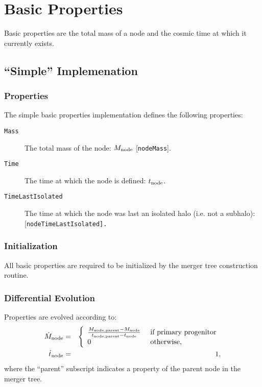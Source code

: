 \section{Basic Properties}\label{sec:ComponentBasicProperties}

Basic properties are the total mass of a \gls{node} and the cosmic time at which it currently exists.

\subsection{``Simple'' Implemenation}

\subsubsection{Properties}

The simple basic properties implementation defines the following properties:
\begin{description}
 \item [{\tt Mass}] The total mass of the node: $M_{\rm node}$ [{\tt nodeMass}].
 \item [{\tt Time}] The time at which the \gls{node} is defined: $t_{\rm node}$.
 \item [{\tt TimeLastIsolated}] The time at which the \gls{node} was last an isolated halo (i.e. not a subhalo): [\tt nodeTimeLastIsolated].
\end{description}

\subsubsection{Initialization}

All basic properties are required to be initialized by the merger tree construction routine.

\subsubsection{Differential Evolution}

Properties are evolved according to:
\begin{eqnarray}
 \dot{M}_{\rm node} &=& \left\{\begin{array}{ll}{M_{\rm node, parent} - M_{\rm node} \over t_{\rm node, parent} - t_{\rm node}} & \hbox{ if primary progenitor} \\ 0 & \hbox{ otherwise}, \end{array} \right. \\
 \dot{t}_{\rm node} &=& 1,
\end{eqnarray}
where the ``parent'' subscript indicates a property of the parent \gls{node} in the merger tree.

